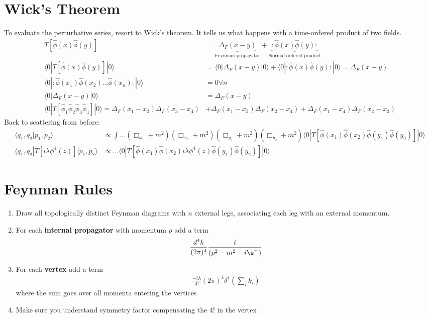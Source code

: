 \documentclass[a4paper, 11pt, normalem]{report}
\newcommand\hphi{\hat{\phi}}
\begin{document}
\section{Wick's Theorem}
To evaluate the perturbative series, resort to Wick's theorem. 
It tells us what happens with a time-ordered product of two fields.
\begin{align}
    T[\hphi(x)\hphi(y)] &= \underbrace{\Delta_F(x-y)}_{\text{Feynman propagator}} + \underbrace{:\hphi(x)\hphi(y):}_{\text{Normal ordered product}} \\
    \langle0|T[\hphi(x)\hphi(y)]|0\rangle &= \langle0|\Delta_F(x-y)|0\rangle + \langle0|:\hphi(x)\hphi(y):|0\rangle = \Delta_F(x-y) \\
    \langle0|:\hphi(x_1)\hphi(x_2)\dots\hphi(x_n):|0\rangle &= 0 \forall n \\
    \langle0|\Delta_F(x-y)|0\rangle &= \Delta_F(x-y) \\
    \langle0|T[\hphi_1\hphi_2\hphi_3\hphi_4]|0\rangle = \Delta_F(x_1-x_2)\Delta_F(x_3-x_4) &+ \Delta_F(x_1-x_3)\Delta_F(x_2-x_4) + \Delta_F(x_1-x_4)\Delta_F(x_2-x_3)
\end{align}
Back to scattering from before:
\begin{align}
    \langle q_1,q_2|p_1,p_2\rangle &\propto \int \dots (\Box_{x_1}+m^2)(\Box_{x_2}+m^2)(\Box_{y_1}+m^2)(\Box_{y_2}+m^2)\langle0|T[\hphi(x_1)\hphi(x_2)\hphi(y_1)\hphi(y_2)]|0\rangle \\
    \langle q_1,q_2|T[i\lambda\phi^4(z)]|p_1,p_2\rangle &\propto \dots \langle0|T[\hphi(x_1)\hphi(x_2)i\lambda\phi^4(z)\hphi(y_1)\hphi(y_2)]|0\rangle
\end{align}

\section{Feynman Rules}
\begin{enumerate}
    \item Draw all topologically distinct Feynman diagrams with $n$ external legs, associating each leg with an external momentum.
    \item For each \textbf{internal propagator} with momentum $p$ add a term
        \begin{align}
            \frac{d^4k}{(2\pi)^4}\frac{i}{(p^2-m^2-i\e^+)}
        \end{align}
    \item For each \textbf{vertex} add a term
        \begin{align}
            \frac{-i\lambda}{4!}(2\pi)^4\delta^4\left(\sum_i k_i\right)
        \end{align}
        where the sum goes over all momenta entering the vertices
    \item Make sure you understand symmetry factor compensating the $4!$ in the vertex
\end{enumerate}
\end{document}
